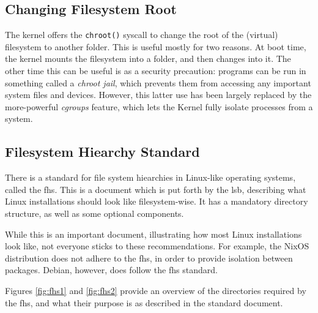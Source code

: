 \documentclass[a4paper]{article}
\begin{document}
\subsection{Changing Filesystem Root}

The kernel offers the \verb|chroot()| syscall to change the root of the (virtual) filesystem to another folder. This is useful mostly for two reasons. At boot time, the kernel mounts the filesystem into a folder, and then changes into it. The other time this can be useful is as a security precaution: programs can be run in something called a \emph{chroot jail}, which prevents them from accessing any important system files and devices. However, this latter use has been largely replaced by the more-powerful \emph{cgroups} feature, which lets the Kernel fully isolate processes from a system.

\subsection{Filesystem Hiearchy Standard}

There is a standard for file system hiearchies in Linux-like operating systems, called the \gls{fhs}. This is a document which is put forth by the \gls{lsb}, describing what Linux installations should look like filesystem-wise\cite{fhs3}. It has a mandatory directory structure, as well as some optional components. 

While this is an important document, illustrating how most Linux installations look like, not everyone sticks to these recommendations. For example, the NixOS distribution does not adhere to the \gls{fhs}, in order to provide isolation between packages\cite{vanderburg2011}. Debian, however, does follow the \gls{fhs} standard.

Figures \ref{fig:fhs1} and \ref{fig:fhs2} provide an overview of the directories required by the \gls{fhs}, and what their purpose is as described in the standard document.
\end{document}
